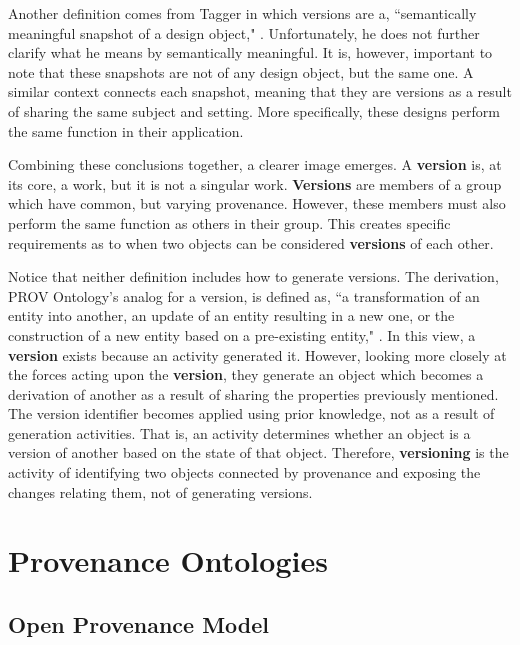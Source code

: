 Another definition comes from Tagger in which versions are a, ``semantically meaningful snapshot of a design object," \cite{Tagger2005}.
Unfortunately, he does not further clarify what he means by semantically meaningful.
It is, however, important to note that these snapshots are not of any design object, but the same one.
A similar context connects each snapshot, meaning that they are versions as a result of sharing the same subject and setting.
More specifically, these designs perform the same function in their application.

Combining these conclusions together, a clearer image emerges.
A \textbf{version} is, at its core, a work, but it is not a singular work.
\textbf{Versions} are members of a group which have common, but varying provenance.
However, these members must also perform the same function as others in their group.
This creates specific requirements as to when two objects can be considered \textbf{versions} of each other.

Notice that neither definition includes how to generate versions.
The derivation, PROV Ontology's analog for a version, is defined as, ``a transformation of an entity into another, an update of an entity resulting in a new one, or the construction of a new entity based on a pre-existing entity," \cite{Lebo2013}.
In this view, a \textbf{version} exists because an activity generated it.
However, looking more closely at the forces acting upon the \textbf{version}, they generate an object which becomes a derivation of another as a result of sharing the properties previously mentioned.
The version identifier becomes applied using prior knowledge, not as a result of generation activities.
That is, an activity determines whether an object is a version of another based on the state of that object.
Therefore, \textbf{versioning} is the activity of identifying two objects connected by provenance and exposing the changes relating them, not of generating versions.

\section{Provenance Ontologies}

\subsection{Open Provenance Model}

